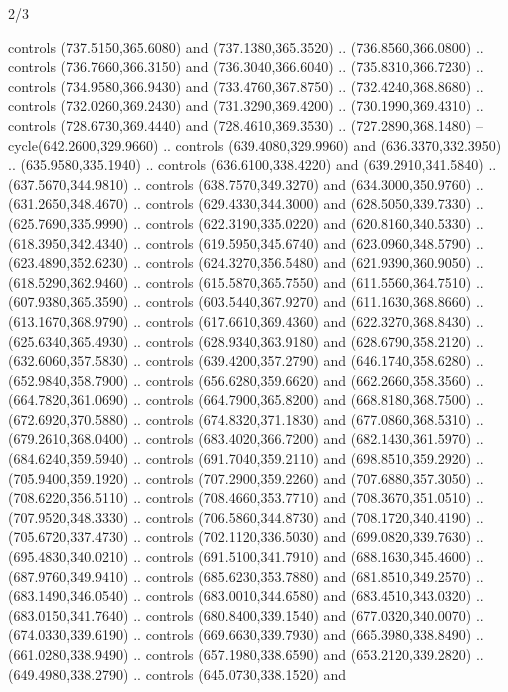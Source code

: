 \begin{flagdescription}{2/3}
\begin{scope}[xshift=\flaglength/2,yshift=\flagwidth/2,scale=\flagwidth/341]
\begin{scope}[xshift=-20mm,yshift=38.3mm,scale=0.1565]
\begin{scope}[y=0.80pt, x=0.80pt, yscale=-1, xscale=1,draw=gold,fill=white]
\begin{scope}[line join=round,line cap=round,line width=1.016\lw]
\begin{scope}[fill]
  controls (737.5150,365.6080) and (737.1380,365.3520) .. (736.8560,366.0800) ..
  controls (736.7660,366.3150) and (736.3040,366.6040) .. (735.8310,366.7230) ..
  controls (734.9580,366.9430) and (733.4760,367.8750) .. (732.4240,368.8680) ..
  controls (732.0260,369.2430) and (731.3290,369.4200) .. (730.1990,369.4310) ..
  controls (728.6730,369.4440) and (728.4610,369.3530) .. (727.2890,368.1480) --
  cycle(642.2600,329.9660) .. controls (639.4080,329.9960) and
  (636.3370,332.3950) .. (635.9580,335.1940) .. controls (636.6100,338.4220) and
  (639.2910,341.5840) .. (637.5670,344.9810) .. controls (638.7570,349.3270) and
  (634.3000,350.9760) .. (631.2650,348.4670) .. controls (629.4330,344.3000) and
  (628.5050,339.7330) .. (625.7690,335.9990) .. controls (622.3190,335.0220) and
  (620.8160,340.5330) .. (618.3950,342.4340) .. controls (619.5950,345.6740) and
  (623.0960,348.5790) .. (623.4890,352.6230) .. controls (624.3270,356.5480) and
  (621.9390,360.9050) .. (618.5290,362.9460) .. controls (615.5870,365.7550) and
  (611.5560,364.7510) .. (607.9380,365.3590) .. controls (603.5440,367.9270) and
  (611.1630,368.8660) .. (613.1670,368.9790) .. controls (617.6610,369.4360) and
  (622.3270,368.8430) .. (625.6340,365.4930) .. controls (628.9340,363.9180) and
  (628.6790,358.2120) .. (632.6060,357.5830) .. controls (639.4200,357.2790) and
  (646.1740,358.6280) .. (652.9840,358.7900) .. controls (656.6280,359.6620) and
  (662.2660,358.3560) .. (664.7820,361.0690) .. controls (664.7900,365.8200) and
  (668.8180,368.7500) .. (672.6920,370.5880) .. controls (674.8320,371.1830) and
  (677.0860,368.5310) .. (679.2610,368.0400) .. controls (683.4020,366.7200) and
  (682.1430,361.5970) .. (684.6240,359.5940) .. controls (691.7040,359.2110) and
  (698.8510,359.2920) .. (705.9400,359.1920) .. controls (707.2900,359.2260) and
  (707.6880,357.3050) .. (708.6220,356.5110) .. controls (708.4660,353.7710) and
  (708.3670,351.0510) .. (707.9520,348.3330) .. controls (706.5860,344.8730) and
  (708.1720,340.4190) .. (705.6720,337.4730) .. controls (702.1120,336.5030) and
  (699.0820,339.7630) .. (695.4830,340.0210) .. controls (691.5100,341.7910) and
  (688.1630,345.4600) .. (687.9760,349.9410) .. controls (685.6230,353.7880) and
  (681.8510,349.2570) .. (683.1490,346.0540) .. controls (683.0010,344.6580) and
  (683.4510,343.0320) .. (683.0150,341.7640) .. controls (680.8400,339.1540) and
  (677.0320,340.0070) .. (674.0330,339.6190) .. controls (669.6630,339.7930) and
  (665.3980,338.8490) .. (661.0280,338.9490) .. controls (657.1980,338.6590) and
  (653.2120,339.2820) .. (649.4980,338.2790) .. controls (645.0730,338.1520) and

\end{scope}
\end{scope}
\end{scope}
\end{scope}
\end{scope}
\end{flagdescription}
